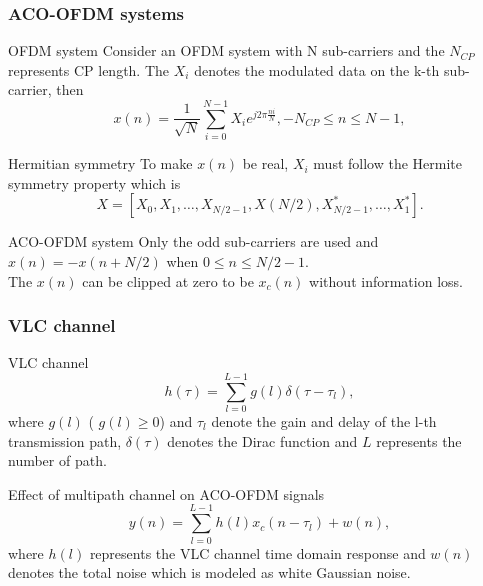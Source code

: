 \documentclass[8 pt]{beamer} %
\begin{document}
\begin{frame}
\frametitle{ACO-OFDM systems}
\begin{block}{OFDM system}
Consider an OFDM system with N sub-carriers and the $N_{CP}$ represents CP length. The $X_{i}$ denotes the modulated data on the k-th sub-carrier, then 
\begin{equation}\label{equ:ACO_OFDM_base}
          x(n)=\frac{1}{\sqrt{N}}\sum_{i=0}^{N-1}X_{i}e^{j2\pi\frac{ni}{N}},-N_{CP}\leq n \leq N-1,
\end{equation}
\end{block}
\pause
\begin{block}{Hermitian symmetry}
To make $x(n)$ be real, $X_{i}$ must follow the Hermite symmetry property which is
\begin{equation}\label{equ:Hermite_symmetry}
          X=[X_0,X_1,\ldots,X_{N/2-1},X(N/2),X_{N/2-1}^{*},\ldots,X_{1}^{*}].
\end{equation}
\end{block}

\pause
\begin{block}{ACO-OFDM system}
Only the odd sub-carriers are used and $ x(n)=-x(n+N/2) $ when $
0\leq n\leq N/2-1 $.\\
The $ x(n) $ can be clipped at zero to be $ x_c(n) $ without information loss.
\end{block}

        
\end{frame}

\begin{frame}
\frametitle{VLC channel}
\begin{block}{VLC channel}
\begin{equation}\label{channel_model}
          h(\tau)=\sum_{l=0}^{L-1}g(l)\delta(\tau-\tau_l),
\end{equation}
where $g(l)$ ( $g(l)\geq0$) and $\tau_l$ denote the gain and delay of the l-th transmission path, $\delta(\tau)$ denotes the Dirac function and $L$ represents the number of path.

\end{block}
        
\pause

\begin{block}{Effect of multipath channel on ACO-OFDM signals}
\begin{equation}\label{equ:multipath_effect}
          y(n)=\sum_{l=0}^{L-1}h(l)x_c(n-\tau_l)+w(n),
        \end{equation}
        where $h(l)$ represents the VLC channel time domain response and $w(n)$ denotes the total noise which is modeled as white Gaussian noise\cite{Narmanlioglu2015}.
\end{block}

\end{frame}
\end{document}
